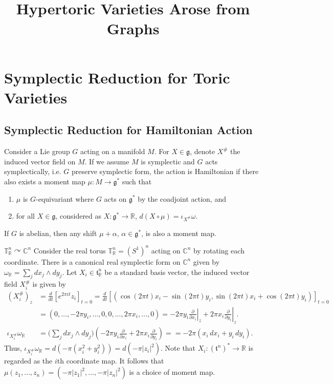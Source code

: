 \documentclass[b5paper]{article}
\title{\bf{
Hypertoric Varieties Arose from Graphs
}}
\newcommand{\acton}{\curvearrowright}
\newcommand{\ind}[1]{#1^\#}
\newcommand{\intd}[1]{\iota_{#1}}
\begin{document}
\maketitle
\vspace{-3.5em}
%

\thispagestyle{empty}
\tableofcontents
\listoftodos

\section{Symplectic Reduction for Toric Varieties}

\subsection{Symplectic Reduction for Hamiltonian Action}

Consider a Lie group $G$ acting on a manifold $M$. For $X\in\mathfrak{g}$, denote $\ind{X}$ the induced vector field on $M$. If we assume $M$ is symplectic and $G$ acts symplectically, i.e. $G$ preserve symplectic form, the action is Hamiltonian if there also exists a moment map $\mu : M \to \mathfrak{g}^*$ such that
\begin{enumerate}
    \item $\mu$ is $G$-equivariant where $G$ acts on $\mathfrak{g}^*$ by the coadjoint action, and
    \item for all $X \in \mathfrak{g}$, considered as $X : \mathfrak{g}^* \to \mathbb{R}$, $d(X \circ \mu) = \intd{\ind{X}}\omega$.
\end{enumerate}
If $G$ is abelian, then any shift $\mu+\alpha$, $\alpha\in\mathfrak{g}^*$, is also a moment map.

\begin{example}{$\mathbb{T}_\mathbb{R}^n \acton \mathbb{C}^n$}
    Consider the real torus $\mathbb{T}_\mathbb{R}^n=(S^1)^n$ acting on $\mathbb{C}^n$ by rotating each coordinate. There is a canonical real symplectic form on $\mathbb{C}^n$ given by $\omega_\mathbb{R}=\sum_jdx_j\wedge dy_j$. Let $X_i\in\mathfrak{t}_\mathbb{R}^n$ be a standard basis vector, 
    the induced vector field $\ind{X_i}$ is given by
    \begin{align*}
        (\ind{X_i})_z &= \frac{d}{dt} [e^{2\pi it} z_i]_{t=0}
        = \frac{d}{dt} [(\cos(2\pi t) x_i - \sin(2\pi t) y_i,\sin(2\pi t)x_i + \cos(2\pi t)y_i)]_{t=0} \\
        &= (0, \dots, -2\pi y_i, \dots, 0, 0, \dots, 2\pi x_i, \dots, 0) = -2\pi y_i \left.\frac{\partial}{\partial x_i}\right|_z + 2\pi x_i \left.\frac{\partial}{\partial y_i}\right|_z.\\
        \intd{\ind{X_i}}\omega_\mathbb{R} &= \biggl(\sum_j dx_j \wedge dy_j\biggr)\left(-2\pi y_i \frac{\partial}{\partial x_i} + 2\pi x_i \frac{\partial}{\partial y_i}\right) = 
        = -2\pi (x_i \, dx_i + y_i \, dy_i).
    \end{align*}
    Thus, $\intd{\ind{X_i}}\omega_\mathbb{R} = d(-\pi(x_i^2 + y_i^2)) = d(-\pi|z_i|^2)$. Note that $X_i : (\mathfrak{t}^n)^* \to \mathbb{R}$ is regarded as the $i$th coordinate map. It follows that $\mu(z_1, \dots, z_n) = (-\pi|z_1|^2, \dots, -\pi|z_n|^2)$ is a choice of moment map.
\end{example}
\end{document}
